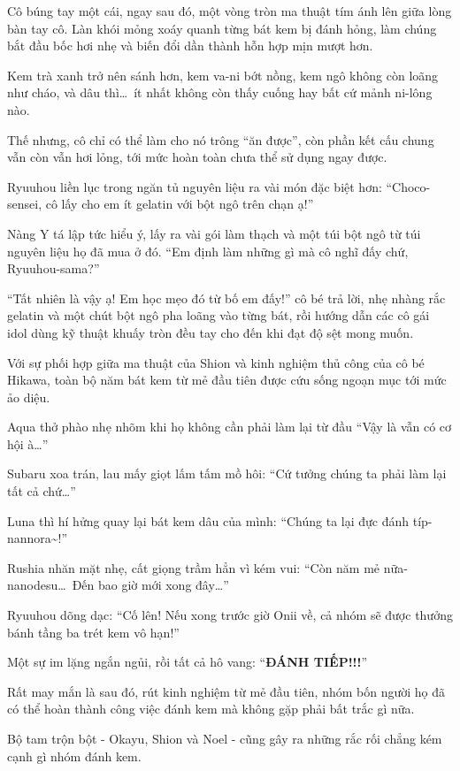 \documentclass[../main.tex]{subfiles}
\begin{document}
Cô búng tay một cái, ngay sau đó, một vòng tròn ma thuật tím ánh lên giữa lòng bàn tay cô. Làn khói mỏng xoáy quanh từng bát kem bị đánh hỏng, làm chúng bắt đầu bốc hơi nhẹ và biến đổi dần thành hỗn hợp mịn mượt hơn.

Kem trà xanh trở nên sánh hơn, kem va-ni bớt nồng, kem ngô không còn loãng như cháo, và dâu thì\dots\ ít nhất không còn thấy cuống hay bất cứ mảnh ni-lông nào.

Thế nhưng, cô chỉ có thể làm cho nó trông ``ăn được'', còn phần kết cấu chung vẫn còn vẫn hơi lỏng, tới mức hoàn toàn chưa thể sử dụng ngay được.

Ryuuhou liền lục trong ngăn tủ nguyên liệu ra vài món đặc biệt hơn: ``Choco-sensei, cô lấy cho em ít gelatin với bột ngô trên chạn ạ!''

Nàng Y tá lập tức hiểu ý, lấy ra vài gói làm thạch và một túi bột ngô từ túi nguyên liệu họ đã mua ở đó. ``Em định làm những gì mà cô nghĩ đấy chứ, Ryuuhou-sama?''

``Tất nhiên là vậy ạ! Em học mẹo đó từ bố em đấy!'' cô bé trả lời, nhẹ nhàng rắc gelatin và một chút bột ngô pha loãng vào từng bát, rồi hướng dẫn các cô gái idol dùng kỹ thuật khuấy tròn đều tay cho đến khi đạt độ sệt mong muốn.

Với sự phối hợp giữa ma thuật của Shion và kinh nghiệm thủ công của cô bé Hikawa, toàn bộ năm bát kem từ mẻ đầu tiên được cứu sống ngoạn mục tới mức ảo diệu.

Aqua thở phào nhẹ nhõm khi họ không cần phải làm lại từ đầu ``Vậy là vẫn có cơ hội à\dots''

Subaru xoa trán, lau mấy giọt lấm tấm mồ hôi: ``Cứ tưởng chúng ta phải làm lại tất cả chứ\dots''

Luna thì hí hửng quay lại bát kem dâu của mình: ``Chúng ta lại đực đánh típ-nannora\~{}!''

Rushia nhăn mặt nhẹ, cất giọng trầm hẳn vì kém vui: ``Còn năm mẻ nữa-nanodesu\dots\ Đến bao giờ mới xong đây\dots''

Ryuuhou dõng dạc: ``Cố lên! Nếu xong trước giờ Onii về, cả nhóm sẽ được thưởng bánh tầng ba trét kem vô hạn!''

Một sự im lặng ngắn ngủi, rồi tất cả hô vang: ``\textbf{ĐÁNH TIẾP!!!}''

Rất may mắn là sau đó, rút kinh nghiệm từ mẻ đầu tiên, nhóm bốn người họ đã có thể hoàn thành công việc đánh kem mà không gặp phải bất trắc gì nữa.

\ct

Bộ tam trộn bột - Okayu, Shion và Noel - cũng gây ra những rắc rối chẳng kém cạnh gì nhóm đánh kem.
\end{document}
